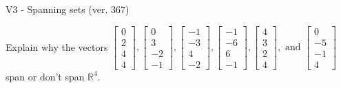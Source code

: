 \begin{exercise}
  \begin{exerciseTitle}V3 - Spanning sets (ver. 367)\end{exerciseTitle}
  \begin{exerciseStatement}
    Explain why the vectors \(\left[\begin{array}{r}
0 \\
2 \\
4 \\
4
\end{array}\right] , \left[\begin{array}{r}
0 \\
3 \\
-2 \\
-1
\end{array}\right] , \left[\begin{array}{r}
-1 \\
-3 \\
4 \\
-2
\end{array}\right] , \left[\begin{array}{r}
-1 \\
-6 \\
6 \\
-1
\end{array}\right] , \left[\begin{array}{r}
4 \\
3 \\
2 \\
4
\end{array}\right] , \text{ and } \left[\begin{array}{r}
0 \\
-5 \\
-1 \\
4
\end{array}\right]\) span or don't span \(\mathbb{R}^4\). 
	



\end{exerciseStatement}
\end{exercise}
